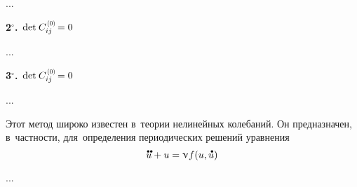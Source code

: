 \begin{otherlanguage}{russian}
...


\indent \textbf{2$^{\circ}$\hspace{-1ex}.}\, ${\operatorname{det} \hspace{.16ex} C_{ij}^{\hspace{0.2ex}\scalebox{0.66}[0.66]{(0)}} \hspace{-0.25ex} = 0}$

...


\indent \textbf{3$^{\circ}$\hspace{-1ex}.}\, ${\operatorname{det} \hspace{.16ex} C_{ij}^{\hspace{0.2ex}\scalebox{0.66}[0.66]{(0)}} \hspace{-0.25ex} = 0}$

...



\end{otherlanguage}




\begin{otherlanguage}{russian}

Этот метод широко известен в~теории нелинейных колебаний. Он предназначен, в~частности, для~определения периодических решений уравнения
\begin{equation}\label{nonlinearvibrations:famousequation}
\mathdotdotabove{u} + u = \smallparameter \hspace{.1ex} f(u, \mathdotabove{u})
\end{equation}

...



\end{otherlanguage}



